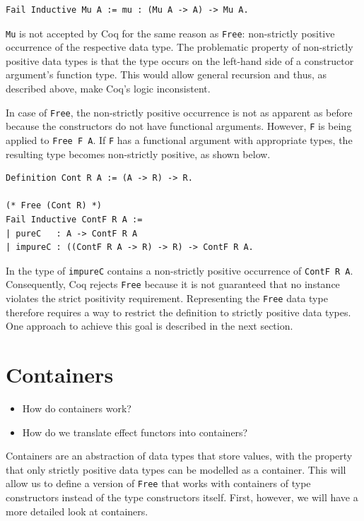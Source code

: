 \documentclass[a4paper, 11pt, fleqn, twoside]{scrreprt}
\begin{document}
\begin{verbatim}
Fail Inductive Mu A := mu : (Mu A -> A) -> Mu A.
\end{verbatim}

\texttt{Mu} is not accepted by Coq for the same reason as 
\texttt{Free}: non-strictly positive occurrence of the respective data 
type. The problematic property of non-strictly positive data types is that the 
type occurs on the left-hand side of a constructor argument's function type. 
This would allow general recursion and thus, as described above, make Coq's 
logic inconsistent.

In case of \texttt{Free}, the non-strictly positive occurrence is not 
as apparent as before because the constructors do not have functional 
arguments. However, \texttt{F} is being applied to 
\texttt{Free F A}. If \texttt{F} has a functional argument 
with appropriate types, the resulting type becomes non-strictly positive, as 
shown below.

\begin{verbatim}
Definition Cont R A := (A -> R) -> R.

(* Free (Cont R) *)
Fail Inductive ContF R A :=
| pureC   : A -> ContF R A
| impureC : ((ContF R A -> R) -> R) -> ContF R A.
\end{verbatim}

In the type of \texttt{impureC} contains a non-strictly positive 
occurrence of \texttt{ContF R A}. Consequently, Coq rejects 
\texttt{Free} because it is not guaranteed that no instance violates 
the strict positivity requirement. Representing the \texttt{Free} data 
type therefore requires a way to restrict the definition to strictly positive 
data types. One approach to achieve this goal is described in the next section.

\section{Containers}

\begin{itemize}
\item How do containers work?
\item How do we translate effect functors into containers?
\end{itemize}

Containers are an abstraction of data types that store values, with the 
property that only strictly positive data types can be modelled as a container. 
This will allow us to define a version of \texttt{Free} that works 
with containers of type constructors instead of the type constructors itself. 
First, however, we will have a more detailed look at containers.
\end{document}

